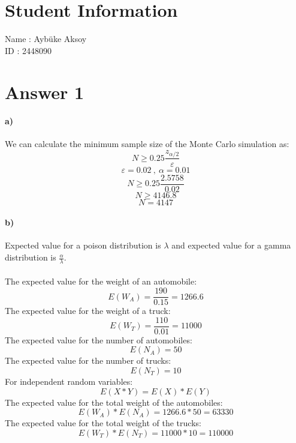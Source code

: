 \documentclass[12pt]{article}
\begin{document}
\section*{Student Information}

Name : Aybüke Aksoy\\

ID : 2448090\\


\section*{Answer 1}
\paragraph{a)}
We can calculate the minimum sample size of the Monte Carlo simulation as:
\[N \geq 0.25\frac{z_{\alpha/2}}{\varepsilon}\]
\[\varepsilon=0.02 \ , \ \alpha=0.01\]
\[N \geq 0.25\frac{2.5758}{0.02}\]
\[N \geq 4146.8\]
\[N=4147\]
\paragraph{b)}
Expected value for a poison distribution is $\lambda$ and expected value for a gamma distribution is $\frac{\alpha}{\lambda}$.\\\\
The expected value for the weight of an automobile:
\[E(W_A)=\frac{190}{0.15}=1266.6\]
The expected value for the weight of a truck:
\[E(W_T)=\frac{110}{0.01}=11000\]
The expected value for the number of automobiles:
\[E(N_A)=50\]
The expected value for the number of trucks:
\[E(N_T)=10\]
For independent random variables:
\[E(X*Y)=E(X)*E(Y)\]
The expected value for the total weight of the automobiles:
\[E(W_A)*E(N_A)=1266.6*50=63330\]
The expected value for the total weight of the trucks:
\[E(W_T)*E(N_T)=11000*10=110000\]
\end{document}
